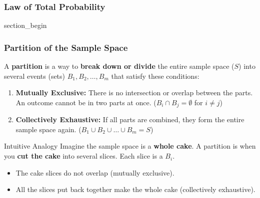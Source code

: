 \subsubsection{Law of Total Probability}
\begin{frame} \vfill \centering \begin{beamercolorbox}[sep=10pt,center,shadow=false,rounded=true]{section_begin} \insertsubsubsectionhead\par \end{beamercolorbox} \vfill \end{frame}
\begin{frame}[t]
\vspace{-2mm}
\footnotesize
\frametitle{Partition of the Sample Space}
  \begin{Definisi}[Partition]
    A \textbf{partition} is a way to \textbf{break down or divide} the entire sample space ($S$) into several events (sets) $B_1, B_2, \dots, B_m$ that satisfy these conditions:
    \begin{enumerate}
        \item \textbf{Mutually Exclusive:} There is no intersection or overlap between the parts. An outcome cannot be in two parts at once. ($B_i \cap B_j = \emptyset$ for $i \neq j$)
        \item \textbf{Collectively Exhaustive:} If all parts are combined, they form the entire sample space again. ($B_1 \cup B_2 \cup \dots \cup B_m = S$)
    \end{enumerate}
  \end{Definisi}
\vspace{-1mm}
  \begin{exampleblock}{Intuitive Analogy}
      Imagine the sample space is a \textbf{whole cake}. A partition is when you \textbf{cut the cake} into several slices. Each slice is a $B_i$.
      \begin{itemize}
          \item The cake slices do not overlap (mutually exclusive).
          \item All the slices put back together make the whole cake (collectively exhaustive).
      \end{itemize}
      \end{exampleblock}
\end{frame}

